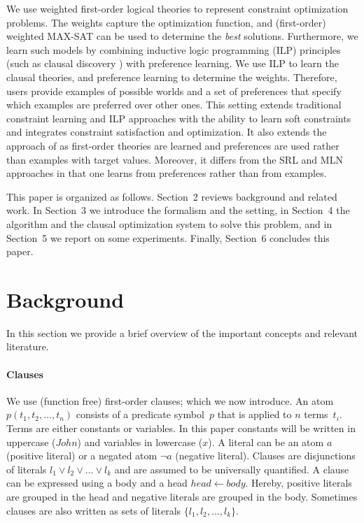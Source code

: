 \documentclass[letterpaper]{article}
\theoremstyle{definition}
\begin{document}
We use weighted first-order logical theories to represent constraint optimization problems.
The weights capture the optimization function, and (first-order) weighted MAX-SAT can be used to determine the \emph{best} solutions.
Furthermore, we learn such models by combining inductive logic programming (ILP) principles (such as clausal discovery \cite{DeRaedt:ClausalDiscovery}) with preference learning.
We use ILP to learn the clausal theories, and preference learning to determine the weights.
Therefore, users provide examples of possible worlds and a set of preferences that specify which examples are preferred over other ones.
This setting extends traditional constraint learning and ILP approaches with the ability to learn soft constraints and integrates constraint satisfaction and optimization.
It also extends the approach of \cite{campigotto2011active} as first-order theories are learned and preferences are used rather than examples with target values.
Moreover, it differs from the SRL and MLN approaches in that one learns from preferences rather than from examples.

This paper is organized as follows.
Section~2 reviews background and related work.
In Section~3 we introduce the formalism and the setting, in Section~4 the algorithm and the clausal optimization system to solve this problem, and in Section~5 we report on some experiments.
Finally, Section~6 concludes this paper.


\section{Background}
In this section we provide a brief overview of the important concepts and relevant literature.

\paragraph{Clauses}
We use (function free) first-order clauses; which we now introduce.
An atom $p(t_1, t_2, ..., t_n)$ consists of a predicate symbol~$p$ that is applied to $n$ terms~$t_i$.
Terms are either constants or variables.
In this paper constants will be written in uppercase ($\mathit{John}$) and variables in lowercase ($\mathit{x}$).
A literal can be an atom $a$ (positive literal) or a negated atom $\lnot a$ (negative literal).
Clauses are disjunctions of literals $l_1 \lor l_2 \lor ... \lor l_k$ and are assumed to be universally quantified.
A clause can be expressed using a body and a head $\mathit{head} \leftarrow \mathit{body}$.
Hereby, positive literals are grouped in the head and negative literals are grouped in the body.
Sometimes clauses are also written as sets of literals $\{l_1, l_2, ..., l_k\}$.
\end{document}
